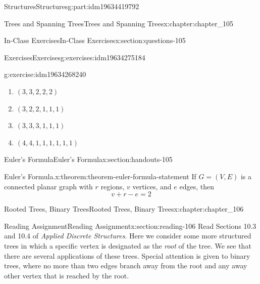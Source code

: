 \documentclass[oneside,10pt,]{book}
\numberwithin{equation}{section}
\begin{document}
\begin{partptx}{Structures}{}{Structures}{}{}{g:part:idm19634419792}
\begin{chapterptx}{Trees and Spanning Trees}{}{Trees and Spanning Trees}{}{}{x:chapter:chapter_105}
\begin{sectionptx}{In-Class Exercises}{}{In-Class Exercises}{}{}{x:section:questions-105}
\begin{exercises-subsection-numberless}{Exercises}{}{Exercises}{}{}{g:exercises:idm19634275184}
\begin{exercisegroup}
\begin{divisionexerciseeg}{5}{}{}{g:exercise:idm19634268240}
\begin{enumerate}[label=(\alph*)]
\item{}\(\displaystyle (3, 3, 2, 2, 2)\)%
\item{}\(\displaystyle (3, 2, 2, 1, 1, 1)\)%
\item{}\(\displaystyle (3, 3, 3, 1, 1, 1)\)%
\item{}\(\displaystyle (4, 4, 1, 1, 1, 1, 1, 1)\)%
\end{enumerate}
%
\end{divisionexerciseeg}%
\end{exercisegroup}
\par\medskip\noindent
\end{exercises-subsection-numberless}
\end{sectionptx}
%
%
\typeout{************************************************}
\typeout{************************************************}
%
\begin{sectionptx}{Euler's Formula}{}{Euler's Formula}{}{}{x:section:handouts-105}
\begin{theorem}{Euler's Formula.}{}{x:theorem:theorem-euler-formula-statement}%
%
If \(G = (V, E)\) is a connected planar graph with \(r\) regions, \(v\) vertices, and \(e\) edges, then%
\begin{equation*}
v + r - e = 2
\end{equation*}
%
\end{theorem}
\end{sectionptx}
\end{chapterptx}
%
\typeout{************************************************}
\typeout{************************************************}
%
\begin{chapterptx}{Rooted Trees, Binary Trees}{}{Rooted Trees, Binary Trees}{}{}{x:chapter:chapter_106}
\index{}%
%
%
\typeout{************************************************}
\typeout{************************************************}
%
\begin{sectionptx}{Reading Assignment}{}{Reading Assignment}{}{}{x:section:reading-106}
Read Sections 10.3 and 10.4 of \emph{Applied Discrete Structures}. Here we consider some more structured trees in which a specific vertex is designated as the \emph{root} of the tree.  We see that there are several applications of these trees.  Special attention is given to binary trees, where no more than two edges branch away from the root and any away other vertex that is reached by the root.%

\end{sectionptx}
\end{chapterptx}
\end{partptx}
\end{document}
